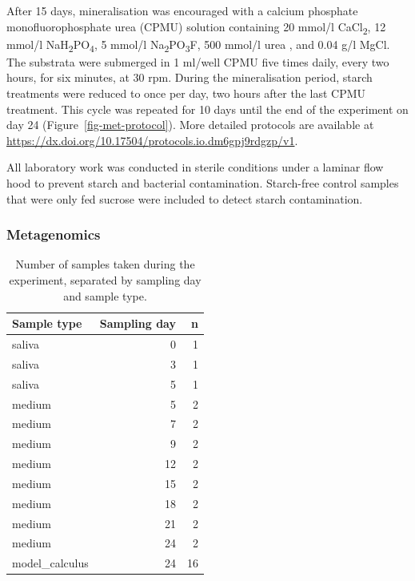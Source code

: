 \documentclass[10pt,a4paper]{article}
\begin{document}
After 15 days, mineralisation was encouraged with a calcium phosphate
monofluorophosphate urea (CPMU) solution containing 20 mmol/l
CaCl\textsubscript{2}, 12 mmol/l
NaH\textsubscript{2}PO\textsubscript{4}, 5 mmol/l
Na\textsubscript{2}PO\textsubscript{3}F, 500 mmol/l urea
\citep{pearceConcomitantDeposition1987, sissonsMultistationPlaque1991},
and 0.04 g/l MgCl. The substrata were submerged in 1 ml/well CPMU five
times daily, every two hours, for six minutes, at 30 rpm. During the
mineralisation period, starch treatments were reduced to once per day,
two hours after the last CPMU treatment. This cycle was repeated for 10
days until the end of the experiment on day 24
(Figure~\ref{fig-met-protocol}). More detailed protocols are available
at \url{https://dx.doi.org/10.17504/protocols.io.dm6gpj9rdgzp/v1}.

All laboratory work was conducted in sterile conditions under a laminar
flow hood to prevent starch and bacterial contamination. Starch-free
control samples that were only fed sucrose were included to detect
starch contamination.

\subsubsection{Metagenomics}\label{metagenomics}

\begin{longtable}[]{@{}lrr@{}}

\caption{\label{tbl-dna-samples}Number of samples taken during the
experiment, separated by sampling day and sample type.}

\tabularnewline

\toprule\noalign{}
Sample type & Sampling day & n \\
\midrule\noalign{}
\endhead
\bottomrule\noalign{}
\endlastfoot
saliva & 0 & 1 \\
saliva & 3 & 1 \\
saliva & 5 & 1 \\
medium & 5 & 2 \\
medium & 7 & 2 \\
medium & 9 & 2 \\
medium & 12 & 2 \\
medium & 15 & 2 \\
medium & 18 & 2 \\
medium & 21 & 2 \\
medium & 24 & 2 \\
model\_calculus & 24 & 16 \\

\end{longtable}
\end{document}
